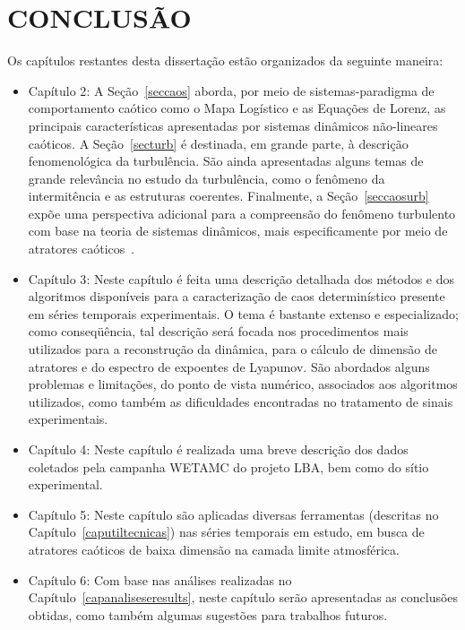 
\chapter{CONCLUSÃO}

Os capítulos restantes desta dissertação estão organizados da seguinte maneira:
\begin{itemize}
\item{Capítulo 2}: A Seção~\ref{seccaos} aborda, por meio de sistemas-paradigma de comportamento caótico como o Mapa Logístico e as Equações de Lorenz, as principais características apresentadas por sistemas dinâmicos não-lineares caóticos. A Seção~\ref{secturb} é destinada, em grande parte, à descrição fenomenológica da turbulência. São ainda apresentadas alguns temas de grande relevância no estudo da turbulência, como o fenômeno da intermitência e as estruturas coerentes. Finalmente, a Seção~\ref{seccaosurb} expõe uma perspectiva adicional para a compreensão do fenômeno turbulento com base na teoria de sistemas dinâmicos, mais especificamente por meio de atratores caóticos~\cite{ruelltak/71}.
\item{Capítulo 3}: Neste capítulo é feita uma descrição detalhada dos métodos e dos algoritmos disponíveis para a caracterização de caos determinístico presente em séries temporais experimentais. O tema é bastante extenso e especializado; como conseqüência, tal descrição será focada nos procedimentos mais utilizados para a reconstrução da dinâmica, para o cálculo de dimensão de atratores e do espectro de expoentes de Lyapunov. São abordados alguns problemas e limitações, do ponto de vista numérico, associados aos algoritmos utilizados, como também as dificuldades encontradas no tratamento de sinais experimentais. 
\item{Capítulo 4}: Neste capítulo é realizada uma breve descrição dos dados coletados pela campanha WETAMC do projeto LBA, bem como do sítio experimental.
\item{Capítulo 5}: Neste capítulo são aplicadas diversas ferramentas (descritas no Capítulo~\ref{caputiltecnicas}) nas séries temporais em estudo, em busca de atratores caóticos de baixa dimensão na camada limite atmosférica.
\item{Capítulo 6}: Com base nas análises realizadas no Capítulo~\ref{capanaliseseresults}, neste capítulo serão apresentadas as conclusões obtidas, como também algumas sugestões para trabalhos futuros.
\end{itemize}

